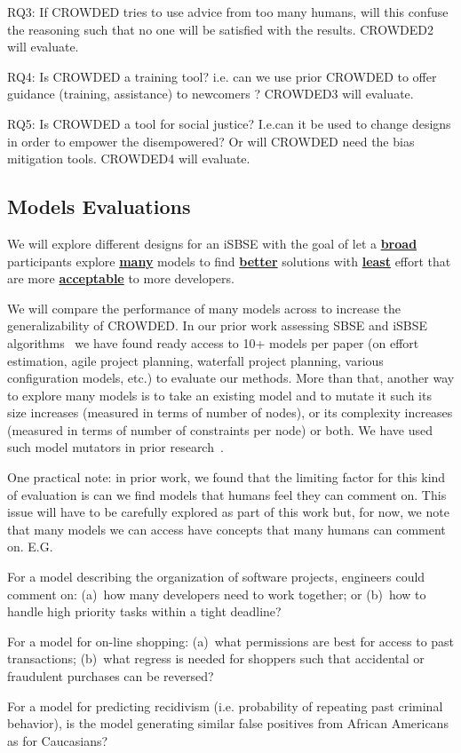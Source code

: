 \item RQ3: If CROWDED tries to use   advice from too many humans, will this confuse the reasoning such that  no one will be satisfied  with the results. CROWDED2 will evaluate.
\item RQ4: Is CROWDED a training tool? i.e. can we use prior    CROWDED to offer guidance (training, assistance) to newcomers ? CROWDED3 will evaluate.
\item RQ5: Is CROWDED a tool for social justice? I.e.can it be used to change designs in order to empower the disempowered?  Or will CROWDED need the bias mitigation tools. CROWDED4 will evaluate.

\ei

\subsection{Models Evaluations}
We will explore different designs for an iSBSE with the goal of let a \underline{\bf broad}
participants explore \underline{\bf many} models to find \underline{\bf better} solutions with \underline{\bf least} effort that are more \underline{\bf acceptable} to more developers. 

We will compare the performance of many models across to increase the generalizability of CROWDED.
 In our prior work assessing SBSE and iSBSE algorithms~\cite{lustosa21,lustosa22,nair18,Nair2016,jchen19} we have found ready access to  10+ models per paper (on effort estimation, agile project planning, waterfall project planning, various configuration models, etc.) to evaluate our methods. More than that, another way to explore many models is to take an existing model and to mutate it such its size increases (measured in terms of number of nodes),  or its complexity increases (measured in terms of number of constraints per node) or both. We have used such model mutators in prior research~\cite{lustosa21}.
 

    
One practical note: in prior work, we found that the limiting factor for this kind
of evaluation is can we find models that humans feel they can comment on. This
issue will have to be carefully explored as part of this work but, for now, we note
that many   models we can access have concepts that many humans   can comment on. E.G.
\bi
\item For a model describing the organization of software projects,
engineers could comment on:  (a)~how many developers need to work together; or
(b)~how to handle high priority tasks within a tight deadline?
\item For a model for on-line shopping:  (a)~what permissions are best for access to past transactions;
(b)~what regress is needed for shoppers such that accidental or fraudulent purchases can be reversed?
\item For a model for predicting recidivism (i.e. probability of repeating  past criminal behavior),
is the model generating similar false positives from African Americans as for Caucasians?
\ei

